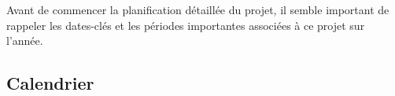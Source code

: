 	Avant de commencer la planification détaillée du projet, il semble important de rappeler les dates-clés et les périodes importantes associées à ce projet sur l'année.

	\subsection{Calendrier} %


